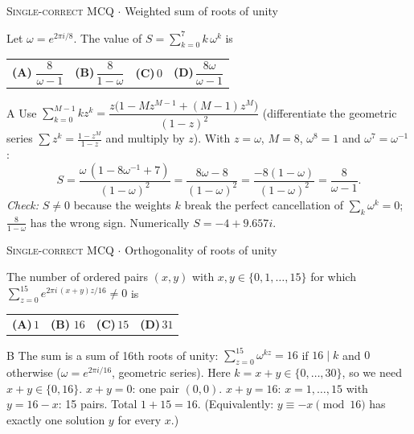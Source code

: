 \documentclass[11pt,a4paper]{article}
\newcommand{\optlabel}[1]{\textbf{(#1)}}
\newcommand{\correctlabel}[1]{\textcolor{okgreen}{\textbf{(#1)}\,\ding{51}}}
\newenvironment{qitem}[1]{\begin{list}{}{\setlength{\leftmargin}{3.3em}\setlength{\labelwidth}{3.1em}%
  \setlength{\labelsep}{0.2em}\setlength{\topsep}{3pt}\setlength{\parsep}{3pt}}\item[\textbf{Q.#1}\hfill]}{\end{list}}
\newcommand{\qsep}{\par\vspace{2pt}{\color{black!15}\hrule}\vspace{4pt}}
\newcommand{\qmeta}[2]{{\footnotesize\color{black!60}\textsc{#1} \;$\cdot$\; #2}\par}
\begin{document}
\begin{qitem}{1}
\qmeta{Single-correct MCQ}{Weighted sum of roots of unity}
Let $\omega = e^{2\pi i/8}$. The value of $\displaystyle S = \sum_{k=0}^{7} k\,\omega^{k}$ is
\par\smallskip\noindent\begin{tabularx}{\linewidth}{@{}*{4}{L}@{}}
\correctlabel{A}\,$\dfrac{8}{\omega - 1}$ & \optlabel{B}\,$\dfrac{8}{1-\omega}$ & \optlabel{C}\,$0$ & \optlabel{D}\,$\dfrac{8\omega}{\omega-1}$
\end{tabularx}
\end{qitem}
\begin{solbox}{A}
Use $\sum_{k=0}^{M-1} k z^k = \dfrac{z\big(1 - M z^{M-1} + (M-1) z^{M}\big)}{(1-z)^2}$ (differentiate the geometric
series $\sum z^k = \frac{1-z^M}{1-z}$ and multiply by $z$). With $z = \omega$, $M = 8$, $\omega^8 = 1$ and $\omega^7 = \omega^{-1}$:
\[ S = \frac{\omega\,(1 - 8\omega^{-1} + 7)}{(1-\omega)^2} = \frac{8\omega - 8}{(1-\omega)^2} = \frac{-8(1-\omega)}{(1-\omega)^2}
     = \frac{8}{\omega - 1}. \]
\emph{Check:} $S \neq 0$ because the weights $k$ break the perfect cancellation of $\sum_k \omega^k = 0$;
$\frac{8}{1-\omega}$ has the wrong sign. Numerically $S = -4 + 9.657i$.
\end{solbox}
\qsep

\begin{qitem}{2}
\qmeta{Single-correct MCQ}{Orthogonality of roots of unity}
The number of ordered pairs $(x, y)$ with $x, y \in \{0, 1, \dots, 15\}$ for which
$\displaystyle \sum_{z=0}^{15} e^{2\pi i\,(x+y)z/16} \neq 0$ is
\par\smallskip\noindent\begin{tabularx}{\linewidth}{@{}*{4}{L}@{}}
\optlabel{A}\,$1$ & \correctlabel{B}\,$16$ & \optlabel{C}\,$15$ & \optlabel{D}\,$31$
\end{tabularx}
\end{qitem}
\begin{solbox}{B}
The sum is a sum of 16th roots of unity: $\sum_{z=0}^{15} \omega^{kz} = 16$ if $16 \mid k$ and $0$ otherwise
($\omega = e^{2\pi i/16}$, geometric series). Here $k = x + y \in \{0, \dots, 30\}$, so we need $x + y \in \{0, 16\}$.
$x + y = 0$: one pair $(0,0)$. $x + y = 16$: $x = 1, \dots, 15$ with $y = 16 - x$: 15 pairs. Total $1 + 15 = 16$.
(Equivalently: $y \equiv -x \pmod{16}$ has exactly one solution $y$ for every $x$.)
\end{solbox}
\qsep
\end{document}
